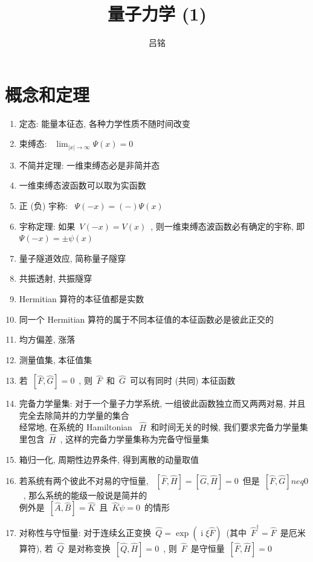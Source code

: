 \documentclass[11pt,a4paper,twocolumn,fleqn]{article}%
\DeclareMathOperator{\mi}{i}
\renewcommand{\[}{~$}
\renewcommand{\]}{$~}%
\begin{document}
\title{量子力学 (1)}
\author{吕铭}
\maketitle
\section{概念和定理}
 \begin{enumerate}
 \setlength\itemsep{0pt}
  \item 定态: 能量本征态, 各种力学性质不随时间改变
  \item 束缚态: \[\lim_{|x|\to\infty} \Psi(x) = 0\]
  \item 不简并定理: 一维束缚态必是非简并态
  \item 一维束缚态波函数可以取为实函数
  \item 正 (负) 宇称: \[\Psi(-x) = (-)\Psi(x)\]
  \item 宇称定理: 如果\[V(-x) = V(x)\], 则一维束缚态波函数必有确定的宇称, 即\[\Psi(-x) = \pm\psi(x)\]
  \item 量子隧道效应, 简称量子隧穿
  \item 共振透射, 共振隧穿
  \item Hermitian 算符的本征值都是实数
  \item 同一个 Hermitian 算符的属于不同本征值的本征函数必是彼此正交的
  \item 均方偏差, 涨落
  \item 测量值集, 本征值集
  \item 若\[[\hat F,\hat G]=0\], 则\[\hat F\]和\[\hat G\]可以有同时 (共同) 本征函数
  \item 完备力学量集: 对于一个量子力学系统, 一组彼此函数独立而又两两对易, 并且完全去除简并的力学量的集合 \\
  	经常地, 在系统的 Hamiltonian \[\hat H\]和时间无关的时候, 我们要求完备力学量集里包含\[\hat H\], 这样的完备力学量集称为完备守恒量集
  \item 箱归一化, 周期性边界条件, 得到离散的动量取值
  \item 若系统有两个彼此不对易的守恒量, \[[\hat F, \hat H] = [\hat G,\hat H] = 0\]但是\[[\hat F, \hat G]neq 0\], 那么系统的能级一般说是简并的\\
  例外是\[[\hat A, \hat B] = \hat K\]且\[\hat K \psi = 0\]的情形
  \item 对称性与守恒量: 对于连续幺正变换\[\hat Q = \exp(\mi\xi\hat F)\](其中\[\hat F^\dagger = \hat F\]是厄米算符), 若\[\hat Q\]是对称变换\[[\hat Q, \hat H] = 0\], 则\[\hat F\]是守恒量\[[\hat F, \hat H]=0\]
  	\begin{itemize}

\end{itemize}
\end{enumerate}
\end{document}
